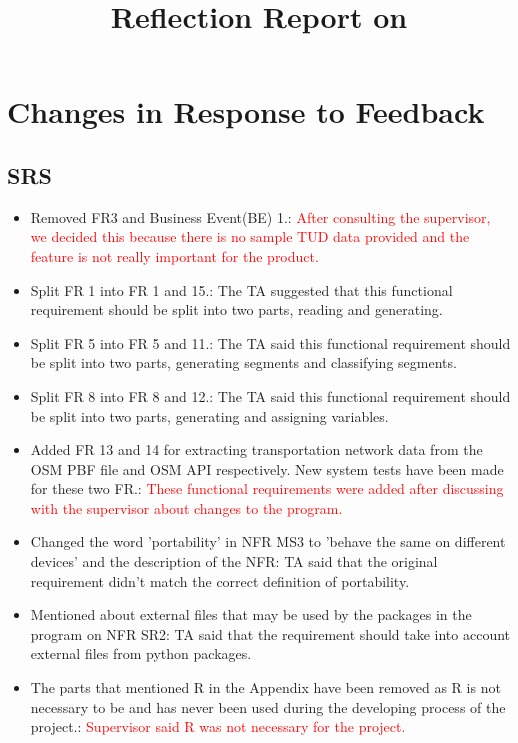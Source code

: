 \documentclass{article}
\title{Reflection Report on \progname}
\author{\authname}
\date{}
\begin{document}
\maketitle


\section{Changes in Response to Feedback}



\subsection{SRS}
\begin{itemize}
    \item Removed FR3 and Business Event(BE) 1.: \textcolor{red}{After consulting the supervisor, we decided this because there is no sample TUD data provided and the feature is not really important for the product.} 
    \item Split FR 1 into FR 1 and 15.: The TA suggested that this functional requirement should be split into two parts, reading and generating.
    \item Split FR 5 into FR 5 and 11.: The TA said this functional requirement should be split into two parts, generating segments and classifying segments.
    \item Split FR 8 into FR 8 and 12.: The TA said this functional requirement should be split into two parts, generating and assigning variables.
    \item Added FR 13 and 14 for extracting transportation network data from the OSM PBF file and OSM API respectively. New system tests have been made for these two FR.: \textcolor{red}{These functional requirements were added after discussing with the supervisor about changes to the program.}
    \item Changed the word 'portability' in NFR MS3 to 'behave the same on different devices' and the description of the NFR: TA said that the original requirement didn't match the correct definition of portability.
    \item Mentioned about external files that may be used by the packages in the program on NFR SR2: TA said that the requirement should take into account external files from python packages.
    \item The parts that mentioned R in the Appendix have been removed as R is not necessary to be and has never been used during the developing process of the project.: \textcolor{red}{Supervisor said R was not necessary for the project.}

\end{itemize}
\end{document}
